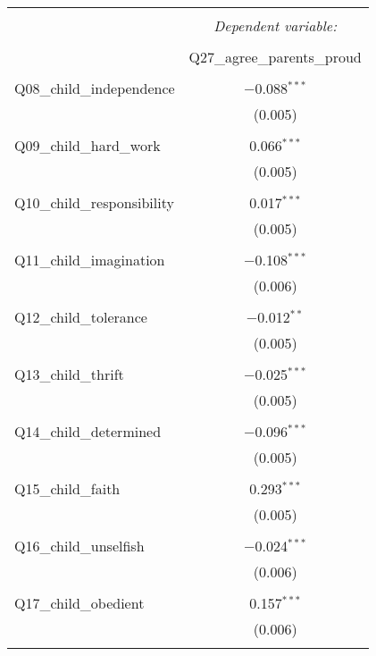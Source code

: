 
\begin{table}[!htbp] \centering 
  \caption{} 
  \label{} 
\begin{tabular}{@{\extracolsep{5pt}}lc} 
\\[-1.8ex]\hline 
\hline \\[-1.8ex] 
 & \multicolumn{1}{c}{\textit{Dependent variable:}} \\ 
\cline{2-2} 
\\[-1.8ex] & Q27\_agree\_parents\_proud \\ 
\hline \\[-1.8ex] 
 Q08\_child\_independence & $-$0.088$^{***}$ \\ 
  & (0.005) \\ 
  & \\ 
 Q09\_child\_hard\_work & 0.066$^{***}$ \\ 
  & (0.005) \\ 
  & \\ 
 Q10\_child\_responsibility & 0.017$^{***}$ \\ 
  & (0.005) \\ 
  & \\ 
 Q11\_child\_imagination & $-$0.108$^{***}$ \\ 
  & (0.006) \\ 
  & \\ 
 Q12\_child\_tolerance & $-$0.012$^{**}$ \\ 
  & (0.005) \\ 
  & \\ 
 Q13\_child\_thrift & $-$0.025$^{***}$ \\ 
  & (0.005) \\ 
  & \\ 
 Q14\_child\_determined & $-$0.096$^{***}$ \\ 
  & (0.005) \\ 
  & \\ 
 Q15\_child\_faith & 0.293$^{***}$ \\ 
  & (0.005) \\ 
  & \\ 
 Q16\_child\_unselfish & $-$0.024$^{***}$ \\ 
  & (0.006) \\ 
  & \\ 
 Q17\_child\_obedient & 0.157$^{***}$ \\ 
  & (0.006) \\ 
  & \\ 

\end{tabular}
\end{table}
